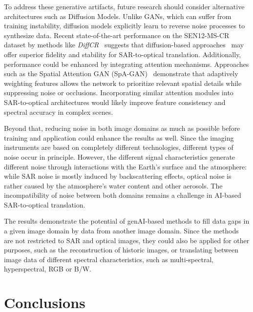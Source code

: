 \documentclass[remotesensing,article,submit,pdftex,moreauthors]{Definitions/mdpi}
\begin{document}
To address these generative artifacts, future research should consider alternative architectures such as Diffusion Models. Unlike GANs, which can suffer from training instability, diffusion models explicitly learn to reverse noise processes to synthesize data. Recent state-of-the-art performance on the SEN12-MS-CR dataset by methods like \textit{DiffCR}~\cite{DiffCR} suggests that diffusion-based approaches~\cite{c_diffusion_s2o, s2o_color_super_diff, SAR_DeCR, strgb_lat_diff} may offer superior fidelity and stability for SAR-to-optical translation. Additionally, performance could be enhanced by integrating attention mechanisms. Approaches such as the Spatial Attention GAN (SpA-GAN)~\cite{CR_RS_spati_atten_GAN} demonstrate that adaptively weighting features allows the network to prioritize relevant spatial details while suppressing noise or occlusions. Incorporating similar attention modules into SAR-to-optical architectures would likely improve feature consistency and spectral accuracy in complex scenes.


Beyond that, reducing noise in both image domains as much as possible before training and application could enhance the results as well. Since the imaging instruments are based on completely different technologies, different types of noise occur in principle. However, the different signal characteristics generate different noise through interactions with the Earth’s surface and the atmosphere: while SAR noise is mostly induced by backscattering effects, optical noise is rather caused by the atmosphere’s water content and other aerosols. The incompatibility of noise between both domains remains a challenge in AI-based SAR-to-optical translation.

The results demonstrate the potential of genAI-based methods to fill data gaps in a given image domain by data from another image domain. Since the methods are not restricted to SAR and optical images, they could also be applied for other purposes, such as the reconstruction of historic images, or translating between image data of different spectral characteristics, such as multi-spectral, hyperspectral, RGB or B/W.




% 
\section{Conclusions}
\end{document}
